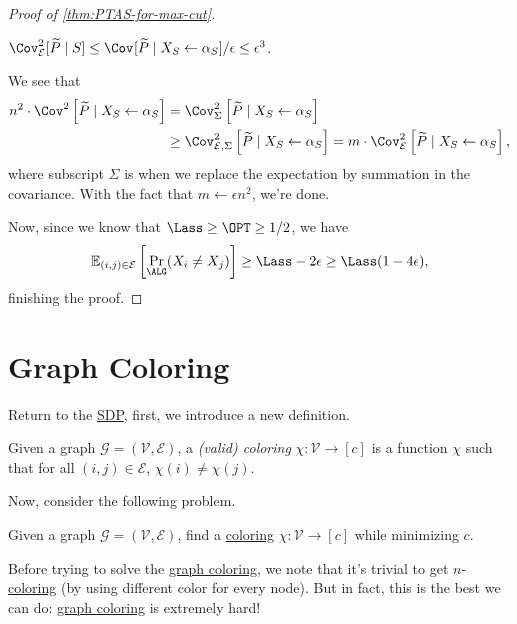 \begin{proof}[Proof of \autoref{thm:PTAS-for-max-cut}]
\[	\]
	\begin{claim}
		\(\Cov_{\mathcal{E} }^2 [ \widetilde{P} \mid S ] \leq \Cov_{}[\widetilde{P} \mid X_S \gets \alpha _S ] / \epsilon \leq \epsilon ^3 \).
	\end{claim}
	\begin{explanation}
		We see that
		\[
			\begin{split}
				n^2\cdot \Cov_{}^2\left[\widetilde{P} \mid X_S \gets \alpha _S \right]
				 & = \Cov_{\Sigma }^2\left[\widetilde{P} \mid X_S\gets \alpha _S \right]                  \\
				 & \geq \Cov_{\mathcal{E} , \Sigma }^2\left[\widetilde{P} \mid X_S\gets \alpha _S \right]
				= m \cdot \Cov_{\mathcal{E} }^2\left[\widetilde{P} \mid X_S \gets \alpha _S \right],
			\end{split}
		\]
		where subscript \(\Sigma \) is when we replace the expectation by summation in the covariance. With the fact that \(m\gets \epsilon n^2\), we're done.
	\end{explanation}
	Now, since we know that \(\Lass \geq \OPT \geq 1 / 2\), we have
	\[
		\mathbb{E}_{(i, j)\in \mathcal{E} }\left[ \Pr_{\ALG}(X_i \neq X_j) \right]
		\geq \Lass - 2 \epsilon \geq \Lass(1 - 4 \epsilon ),
	\]
	finishing the proof.
\end{proof}

\section{Graph Coloring}
Return to the \hyperref[def:SDP]{SDP}, first, we introduce a new definition.

\begin{definition}[Coloring]\label{def:coloring}
	Given a graph \(\mathcal{G} =(\mathcal{V} , \mathcal{E} )\), a \emph{(valid) coloring} \(\chi \colon \mathcal{V} \to [c]\) is a function \(\chi \) such that for all \((i, j)\in \mathcal{E} \), \(\chi (i) \neq \chi (j)\).
\end{definition}

Now, consider the following problem.

\begin{problem}\label{prb:graph-coloring}
Given a graph \(\mathcal{G} =(\mathcal{V} , \mathcal{E} )\), find a \hyperref[def:coloring]{coloring} \(\chi \colon \mathcal{V} \to [c]\) while minimizing \(c\).
\end{problem}

Before trying to solve the \hyperref[prb:graph-coloring]{graph coloring}, we note that it's trivial to get \(n\)-\hyperref[def:coloring]{coloring} (by using different color for every node). But in fact, this is the best we can do: \hyperref[prb:graph-coloring]{graph coloring} is extremely hard!

